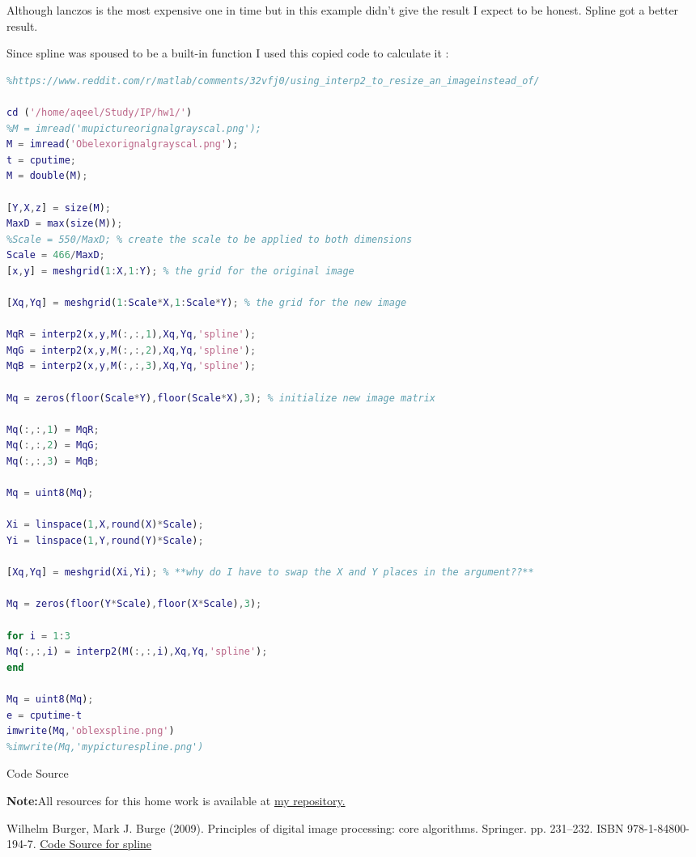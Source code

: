 \documentclass{article}
\begin{document}
Although lanczos is the most expensive one in time but in this example didn't give the result I expect to be honest. Spline got a better result.
\begin{flushleft}

\end{flushleft}

Since spline was spoused to be a built-in function I used this copied code to calculate it :\cite{10}\\

\begin{lstlisting}[language=matlab]
%THIS CODE IS COPIED FROM THIS REPOSITORY 
%https://www.reddit.com/r/matlab/comments/32vfj0/using_interp2_to_resize_an_imageinstead_of/

cd ('/home/aqeel/Study/IP/hw1/')
%M = imread('mupictureorignalgrayscal.png');
M = imread('Obelexorignalgrayscal.png');
t = cputime;
M = double(M);

[Y,X,z] = size(M);
MaxD = max(size(M));
%Scale = 550/MaxD; % create the scale to be applied to both dimensions
Scale = 466/MaxD;
[x,y] = meshgrid(1:X,1:Y); % the grid for the original image

[Xq,Yq] = meshgrid(1:Scale*X,1:Scale*Y); % the grid for the new image

MqR = interp2(x,y,M(:,:,1),Xq,Yq,'spline');
MqG = interp2(x,y,M(:,:,2),Xq,Yq,'spline');
MqB = interp2(x,y,M(:,:,3),Xq,Yq,'spline');

Mq = zeros(floor(Scale*Y),floor(Scale*X),3); % initialize new image matrix

Mq(:,:,1) = MqR;
Mq(:,:,2) = MqG;
Mq(:,:,3) = MqB;

Mq = uint8(Mq);

Xi = linspace(1,X,round(X)*Scale);
Yi = linspace(1,Y,round(Y)*Scale);

[Xq,Yq] = meshgrid(Xi,Yi); % **why do I have to swap the X and Y places in the argument??**

Mq = zeros(floor(Y*Scale),floor(X*Scale),3);

for i = 1:3
Mq(:,:,i) = interp2(M(:,:,i),Xq,Yq,'spline');
end

Mq = uint8(Mq);
e = cputime-t
imwrite(Mq,'oblexspline.png')
%imwrite(Mq,'mypicturespline.png')
\end{lstlisting} Code Source\cite{10}

\textbf{Note:}All resources for this home work is available at \href{https://github.com/aqeel13932/IP/tree/master/hw1}{ my repository.}
\begin{thebibliography}{9}
	Wilhelm Burger, Mark J. Burge (2009). Principles of digital image processing: core algorithms. Springer. pp. 231–232. ISBN 978-1-84800-194-7.
	\href{https://www.reddit.com/r/matlab/comments/32vfj0/using_interp2_to_resize_an_imageinstead_of/}{Code Source for spline}
	

\end{thebibliography}
\end{document}
